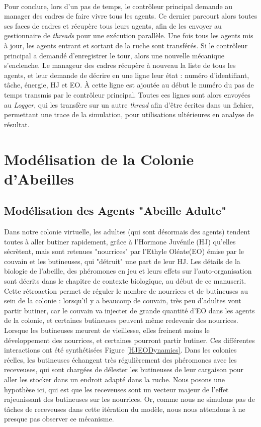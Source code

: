 			\paragraph{}
			Pour conclure, lors d'un pas de temps, le contrôleur principal demande au manager des cadres de faire vivre tous les agents. Ce dernier parcourt alors toutes ses faces de cadres et récupère tous leurs agents, afin de les envoyer au gestionnaire de \textit{threads} pour une exécution parallèle. Une fois tous les agents mis à jour, les agents entrant et sortant de la ruche sont transférés. Si le contrôleur principal a demandé d'enregistrer le tour, alors une nouvelle mécanique s'enclenche. Le manageur des cadres récupère à nouveau la liste de tous les agents, et leur demande de décrire en une ligne leur état : numéro d'identifiant, tâche, énergie, HJ et EO. À cette ligne est ajoutée au début le numéro du pas de temps transmis par le contrôleur principal. Toutes ces lignes sont alors envoyées au \textit{Logger}, qui les transfère sur un autre \textit{thread} afin d'être écrites dans un fichier, permettant une trace de la simulation, pour utilisations ultérieures en analyse de résultat.

	\section{Modélisation de la Colonie d'Abeilles}
	\label{sectionModelColonie}
		\subsection{Modélisation des Agents "Abeille Adulte"}
		
		Dans notre colonie virtuelle, les adultes (qui sont désormais des agents) tendent toutes à aller butiner rapidement, grâce à l'Hormone Juvénile (HJ) qu'elles sécrètent, mais sont retenues "nourrices" par l'Ethyle Oléate(EO) émise par le couvain et les butineuses, qui "détruit" une part de leur HJ. Les détails de la biologie de l'abeille, des phéromones en jeu et leurs effets sur l'auto-organisation sont décrits dans le chapitre de contexte biologique, au début de ce manuscrit. Cette rétroaction permet de réguler le nombre de nourrices et de butineuses au sein de la colonie : lorsqu'il y a beaucoup de couvain, très peu d'adultes vont partir butiner, car le couvain va injecter de grande quantité d'EO dans les agents de la colonie, et certaines butineuses peuvent même redevenir des nourrices. Lorsque les butineuses meurent de vieillesse, elles freinent moins le développement des nourrices, et certaines pourront partir butiner. Ces différentes interactions ont été synthétisées Figure \ref{HJEODynamics}. Dans les colonies réelles, les butineuses échangent très régulièrement des phéromones avec les receveuses, qui sont chargées de délester les butineuses de leur cargaison pour aller les stocker dans un endroit adapté dans la ruche. Nous posons une hypothèse ici, qui est que les receveuses sont un vecteur majeur de l'effet rajeunissant des butineuses sur les nourrices. Or, comme nous ne simulons pas de tâches de receveuses dans cette itération du modèle, nous nous attendons à ne presque pas observer ce mécanisme.
		
